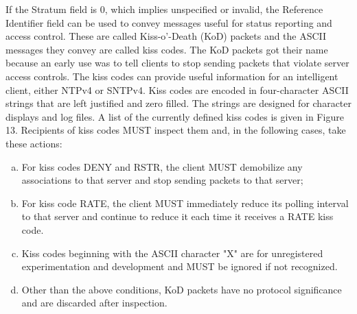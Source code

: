 If the Stratum field is 0, which implies unspecified or invalid, the
Reference Identifier field can be used to convey messages useful for
status reporting and access control. These are called Kiss-o’-Death
(KoD) packets and the ASCII messages they convey are called kiss
codes. The KoD packets got their name because an early use was to
tell clients to stop sending packets that violate server access
controls. The kiss codes can provide useful information for an
intelligent client, either NTPv4 or SNTPv4. Kiss codes are encoded
in four-character ASCII strings that are left justified and zero
filled. The strings are designed for character displays and log
files. A list of the currently defined kiss codes is given in
Figure 13. Recipients of kiss codes MUST inspect them and, in the
following cases, take these actions:

\begin{enumerate}[a.]
  \item For kiss codes DENY and RSTR, the client MUST demobilize any
associations to that server and stop sending packets to that
server;
  \item For kiss code RATE, the client MUST immediately reduce its
polling interval to that server and continue to reduce it each
time it receives a RATE kiss code.
  \item Kiss codes beginning with the ASCII character "X" are for
unregistered experimentation and development and MUST be ignored
if not recognized.
  \item Other than the above conditions, KoD packets have no protocol
significance and are discarded after inspection.
\end{enumerate}

